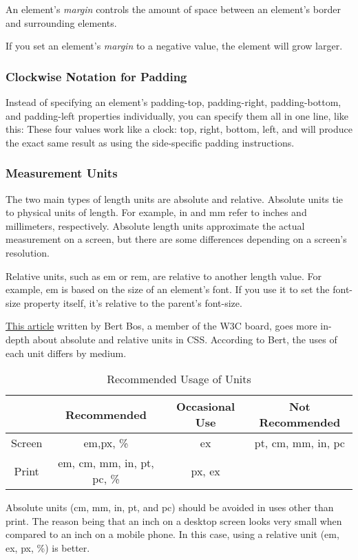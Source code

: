 An element's \emph{margin} controls the amount of space between an element's border and surrounding elements.

If you set an element's \emph{margin} to a negative value, the element will grow larger.

\subsubsection{Clockwise Notation for Padding}
Instead of specifying an element's padding-top, padding-right, padding-bottom, and padding-left properties individually, you can specify them all in one line, like this:
These four values work like a clock: top, right, bottom, left, and will produce the exact same result as using the side-specific padding instructions.

\subsubsection{Measurement Units}
The two main types of length units are absolute and relative. Absolute units tie to physical units of length. For example, in and mm refer to inches and millimeters, respectively. Absolute length units approximate the actual measurement on a screen, but there are some differences depending on a screen's resolution.

Relative units, such as em or rem, are relative to another length value. For example, em is based on the size of an element's font. If you use it to set the font-size property itself, it's relative to the parent's font-size.

\href{https://www.w3.org/Style/Examples/007/units.en.html}{This article} written by Bert Bos, a member of the W3C board, goes more in-depth about absolute and relative units in CSS. According to Bert, the uses of each unit differs by medium.

\begin{table}[h]
    \centering
    \begin{tabular}{c|c|c|c}
         &Recommended & Occasional Use & Not Recommended\\
         \hline\hline
         Screen & em,px, \%&ex&pt, cm, mm, in, pc \\
         Print& em, cm, mm, in, pt, pc, \%&px, ex&\\
    \end{tabular}
    \caption{Recommended Usage of Units}
\end{table}
Absolute units (cm, mm, in, pt, and pc) should be avoided in uses other than print. The reason being that an inch on a desktop screen looks very small when compared to an inch on a mobile phone. In this case, using a relative unit (em, ex, px, \%) is better.

